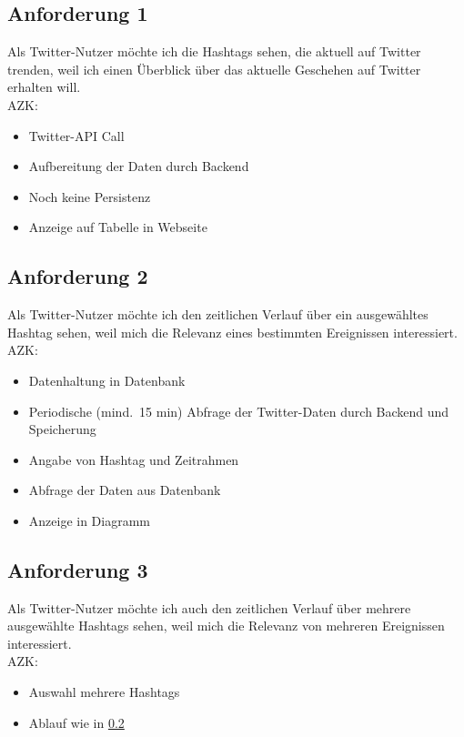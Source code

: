 \documentclass[conference]{IEEEtran}
\begin{document}
\subsection{Anforderung 1}
Als Twitter-Nutzer möchte ich die Hashtags sehen, die aktuell auf Twitter trenden,
weil ich einen Überblick über das aktuelle Geschehen auf Twitter erhalten will.
\\
AZK:
\begin{itemize}
        \item Twitter-API Call
        \item Aufbereitung der Daten durch Backend
        \item Noch keine Persistenz
        \item Anzeige auf Tabelle in Webseite
\end{itemize}

\subsection{Anforderung 2}
\label{2}
Als Twitter-Nutzer möchte ich den zeitlichen Verlauf über ein ausgewähltes Hashtag sehen,
weil mich die Relevanz eines bestimmten Ereignissen interessiert.
\\
AZK:
\begin{itemize}
        \item Datenhaltung in Datenbank
        \item Periodische (mind.\ 15 min) Abfrage der Twitter-Daten durch Backend und Speicherung
        \item Angabe von Hashtag und Zeitrahmen
        \item Abfrage der Daten aus Datenbank
        \item Anzeige in Diagramm
\end{itemize}

\subsection{Anforderung 3}
Als Twitter-Nutzer möchte ich auch den zeitlichen Verlauf über mehrere ausgewählte Hashtags sehen,
weil mich die Relevanz von mehreren Ereignissen interessiert.
\\
AZK:
\begin{itemize}
        \item Auswahl mehrere Hashtags
        \item Ablauf wie in \ref*{2}
\end{itemize}
\end{document}
